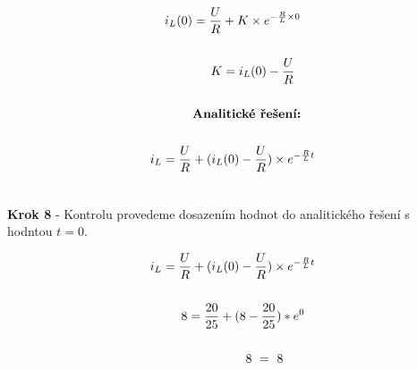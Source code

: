 \begin{gather*}
i_L(0) = \frac{U}{R} + K \times e^{-\frac{R}{L} \times 0} \\\\
\newline
\newline
K = i_L(0) - \frac{U}{R} \\\\
\newline
\newline
\textbf{Analitické řešení:} \\\\
\newline
\newline
i_L = \frac{U}{R} + (i_L(0) - \frac{U}{R}) \times e^{-\frac{R}{L}t} \\\\
\end{gather*}

\begin{center}
\textbf{Krok 8} - Kontrolu provedeme dosazením hodnot do analitického řešení s hodntou $t = 0$. \\
\end{center}
\vspace{-0.5cm}

\begin{gather*}
i_L = \frac{U}{R} + (i_L(0) - \frac{U}{R}) \times e^{-\frac{R}{L}t} \\\\
\newline
\newline
8 = \frac{20}{25} + (8-\frac{20}{25}) * e^0 \\\\
\newline
\newline
8\ =\ 8 \\\\
\end{gather*}